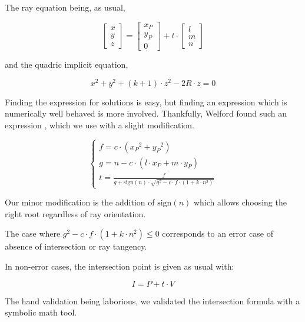 The ray equation being, as usual,

\begin{equation}
\begin{bmatrix} x \\ y \\ z \end{bmatrix} =
\begin{bmatrix} x_P \\ y_P \\ 0 \end{bmatrix} + t \cdot
\begin{bmatrix} l \\ m \\ n \end{bmatrix}
\end{equation}

and the quadric implicit equation,

\begin{equation}
x^2 + y^2 + (k+1) \cdot z^2 - 2R \cdot z = 0
\end{equation}

Finding the expression for solutions is easy, but finding an expression which
is numerically well behaved is more involved. Thankfully, Welford found such
an expression \cite{Welford:1986}, which we use with a slight modification.

\begin{equation} \begin{cases}
f = c \cdot ({x_P}^2 + {y_P}^2) \\
g = n - c \cdot (l \cdot x_P + m \cdot y_P) \\
t = \frac{f}{g + \textrm{sign}(n) \cdot
             \sqrt{g^2 - c \cdot f \cdot (1 + k \cdot n^2)}}
\end{cases} \end{equation}

Our minor modification is the addition of $\textrm{sign}(n)$ which allows
choosing the right root regardless of ray orientation.

The case where $g^2 - c \cdot f \cdot (1 + k \cdot n^2) \leq 0$ corresponds
to an error case of absence of intersection or ray tangency.

In non-error cases, the intersection point is given as usual with:

\begin{equation}
I = P + t \cdot V
\end{equation}

The hand validation being laborious, we validated the intersection formula with
a symbolic math tool.

